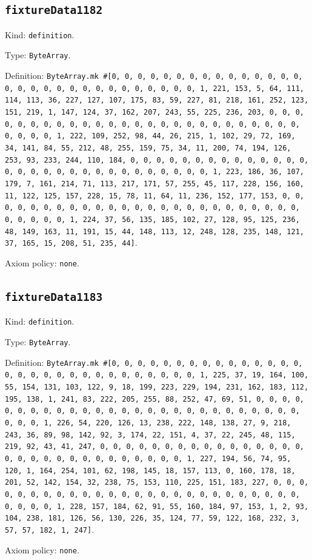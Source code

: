 \documentclass[11pt]{article}
\begin{document}
\subsection*{\texttt{fixtureData1182}}
\noindent Kind: \texttt{definition}.\par
\noindent Type: \texttt{ByteArray}.\par
\noindent Definition: \texttt{ByteArray.mk \#[0, 0, 0, 0, 0, 0, 0, 0, 0, 0, 0, 0, 0, 0, 0, 0, 0, 0, 0, 0, 0, 0, 0, 0, 0, 0, 0, 0, 0, 0, 1, 221, 153, 5, 64, 111, 114, 113, 36, 227, 127, 107, 175, 83, 59, 227, 81, 218, 161, 252, 123, 151, 219, 1, 147, 124, 37, 162, 207, 243, 55, 225, 236, 203, 0, 0, 0, 0, 0, 0, 0, 0, 0, 0, 0, 0, 0, 0, 0, 0, 0, 0, 0, 0, 0, 0, 0, 0, 0, 0, 0, 0, 0, 0, 1, 222, 109, 252, 98, 44, 26, 215, 1, 102, 29, 72, 169, 34, 141, 84, 55, 212, 48, 255, 159, 75, 34, 11, 200, 74, 194, 126, 253, 93, 233, 244, 110, 184, 0, 0, 0, 0, 0, 0, 0, 0, 0, 0, 0, 0, 0, 0, 0, 0, 0, 0, 0, 0, 0, 0, 0, 0, 0, 0, 0, 0, 0, 0, 1, 223, 186, 36, 107, 179, 7, 161, 214, 71, 113, 217, 171, 57, 255, 45, 117, 228, 156, 160, 11, 122, 125, 157, 228, 15, 78, 11, 64, 11, 236, 152, 177, 153, 0, 0, 0, 0, 0, 0, 0, 0, 0, 0, 0, 0, 0, 0, 0, 0, 0, 0, 0, 0, 0, 0, 0, 0, 0, 0, 0, 0, 0, 0, 1, 224, 37, 56, 135, 185, 102, 27, 128, 95, 125, 236, 48, 149, 163, 11, 191, 15, 44, 148, 113, 12, 248, 128, 235, 148, 121, 37, 165, 15, 208, 51, 235, 44]}.\par
\noindent Axiom policy: \texttt{none}.\par
\subsection*{\texttt{fixtureData1183}}
\noindent Kind: \texttt{definition}.\par
\noindent Type: \texttt{ByteArray}.\par
\noindent Definition: \texttt{ByteArray.mk \#[0, 0, 0, 0, 0, 0, 0, 0, 0, 0, 0, 0, 0, 0, 0, 0, 0, 0, 0, 0, 0, 0, 0, 0, 0, 0, 0, 0, 0, 0, 1, 225, 37, 19, 164, 100, 55, 154, 131, 103, 122, 9, 18, 199, 223, 229, 194, 231, 162, 183, 112, 195, 138, 1, 241, 83, 222, 205, 255, 88, 252, 47, 69, 51, 0, 0, 0, 0, 0, 0, 0, 0, 0, 0, 0, 0, 0, 0, 0, 0, 0, 0, 0, 0, 0, 0, 0, 0, 0, 0, 0, 0, 0, 0, 1, 226, 54, 220, 126, 13, 238, 222, 148, 138, 27, 9, 218, 243, 36, 89, 98, 142, 92, 3, 174, 22, 151, 4, 37, 22, 245, 48, 115, 219, 92, 43, 41, 247, 0, 0, 0, 0, 0, 0, 0, 0, 0, 0, 0, 0, 0, 0, 0, 0, 0, 0, 0, 0, 0, 0, 0, 0, 0, 0, 0, 0, 0, 0, 1, 227, 194, 56, 74, 95, 120, 1, 164, 254, 101, 62, 198, 145, 18, 157, 113, 0, 160, 178, 18, 201, 52, 142, 154, 32, 238, 75, 153, 110, 225, 151, 183, 227, 0, 0, 0, 0, 0, 0, 0, 0, 0, 0, 0, 0, 0, 0, 0, 0, 0, 0, 0, 0, 0, 0, 0, 0, 0, 0, 0, 0, 0, 0, 1, 228, 157, 184, 62, 91, 55, 160, 184, 97, 153, 1, 2, 93, 104, 238, 181, 126, 56, 130, 226, 35, 124, 77, 59, 122, 168, 232, 3, 57, 57, 182, 1, 247]}.\par
\noindent Axiom policy: \texttt{none}.\par
\end{document}
